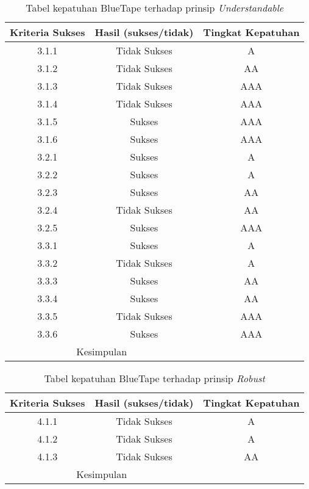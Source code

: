 \begin{table}[H]
    \centering 
    \caption{Tabel kepatuhan BlueTape terhadap prinsip \textit{Understandable}}
    \label{tab:kepatuhan_bluetape_understandable}
    \begin{tabular}{|c|c|c|}
        \toprule
        Kriteria Sukses & Hasil (sukses/tidak) & Tingkat Kepatuhan \\

        \midrule
        3.1.1 & Tidak Sukses & A \\
        3.1.2 & Tidak Sukses & AA \\
        3.1.3 & Tidak Sukses & AAA \\
        3.1.4 & Tidak Sukses & AAA \\
        3.1.5 & Sukses & AAA \\
        3.1.6 & Sukses & AAA \\
        3.2.1 & Sukses & A \\
        3.2.2 & Sukses & A \\
        3.2.3 & Sukses & AA \\
        3.2.4 & Tidak Sukses & AA \\
        3.2.5 & Sukses & AAA \\
        3.3.1 & Sukses & A \\
        3.3.2 & Tidak Sukses & A \\
        3.3.3 & Sukses & AA \\
        3.3.4 & Sukses & AA \\
        3.3.5 & Tidak Sukses & AAA \\
        3.3.6 & Sukses & AAA \\

        \bottomrule
        \multicolumn{2}{|c|}{Kesimpulan} &  \\
        \bottomrule

    \end{tabular}
\end{table}
\begin{table}[H]
    \centering 
    \caption{Tabel kepatuhan BlueTape terhadap prinsip \textit{Robust}}
    \label{tab:kepatuhan_bluetape_robust}
    \begin{tabular}{|c|c|c|}
        \toprule
        Kriteria Sukses & Hasil (sukses/tidak) & Tingkat Kepatuhan\\

        \midrule
        4.1.1 & Tidak Sukses & A \\
        4.1.2 & Tidak Sukses & A \\
        4.1.3 & Tidak Sukses & AA \\

        \bottomrule
        \multicolumn{2}{|c|}{Kesimpulan} &  \\
        \bottomrule

    \end{tabular} 
\end{table}

